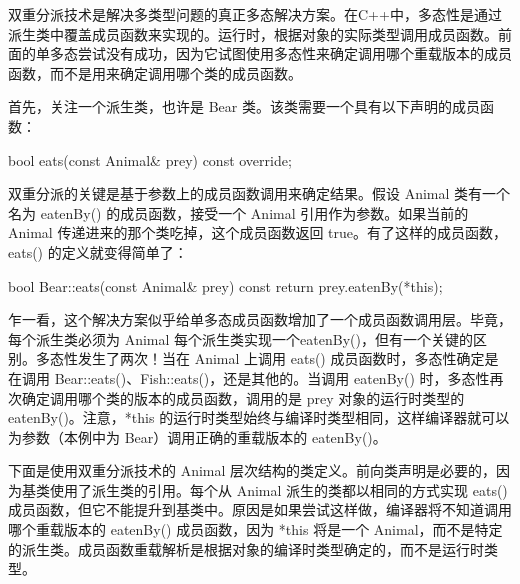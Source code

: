 
双重分派技术是解决多类型问题的真正多态解决方案。在C++中，多态性是通过派生类中覆盖成员函数来实现的。运行时，根据对象的实际类型调用成员函数。前面的单多态尝试没有成功，因为它试图使用多态性来确定调用哪个重载版本的成员函数，而不是用来确定调用哪个类的成员函数。

首先，关注一个派生类，也许是 Bear 类。该类需要一个具有以下声明的成员函数：

\begin{cpp}
bool eats(const Animal& prey) const override;
\end{cpp}

双重分派的关键是基于参数上的成员函数调用来确定结果。假设 Animal 类有一个名为 eatenBy() 的成员函数，接受一个 Animal 引用作为参数。如果当前的 Animal 传递进来的那个类吃掉，这个成员函数返回 true。有了这样的成员函数，eats() 的定义就变得简单了：

\begin{cpp}
bool Bear::eats(const Animal& prey) const
{
    return prey.eatenBy(*this);
}
\end{cpp}

乍一看，这个解决方案似乎给单多态成员函数增加了一个成员函数调用层。毕竟，每个派生类必须为 Animal 每个派生类实现一个eatenBy()，但有一个关键的区别。多态性发生了两次！当在 Animal 上调用 eats() 成员函数时，多态性确定是在调用 Bear::eats()、Fish::eats()，还是其他的。当调用 eatenBy() 时，多态性再次确定调用哪个类的版本的成员函数，调用的是 prey 对象的运行时类型的 eatenBy()。注意，*this 的运行时类型始终与编译时类型相同，这样编译器就可以为参数（本例中为 Bear）调用正确的重载版本的 eatenBy()。

下面是使用双重分派技术的 Animal 层次结构的类定义。前向类声明是必要的，因为基类使用了派生类的引用。每个从 Animal 派生的类都以相同的方式实现 eats() 成员函数，但它不能提升到基类中。原因是如果尝试这样做，编译器将不知道调用哪个重载版本的 eatenBy() 成员函数，因为 *this 将是一个 Animal，而不是特定的派生类。成员函数重载解析是根据对象的编译时类型确定的，而不是运行时类型。

